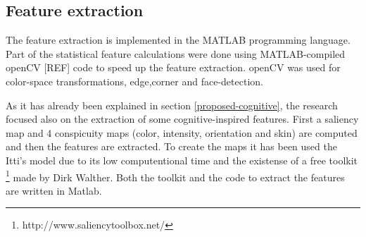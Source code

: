 
\subsection{Feature extraction}
The feature extraction is implemented in the MATLAB programming language. Part of the statistical feature calculations were done using MATLAB-compiled openCV [REF] code to speed up the feature extraction. openCV was used for color-space transformations, edge,corner and face-detection.

As it has already been explained in section \ref{proposed-cognitive}, the research focused also on the extraction of some cognitive-inspired features. First a saliency map and 4 conspicuity maps (color, intensity, orientation and skin) are computed and then the features are extracted. To create the maps it has been used the Itti's model \cite{Itti_model} due to its low computentional time and the existense of a free toolkit \footnote{http://www.saliencytoolbox.net/} made by Dirk Walther. Both the toolkit and the code to extract the features are written in Matlab. 

